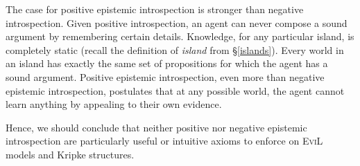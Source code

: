 The case for positive epistemic introspection is stronger than
negative introspection.  Given positive introspection, an agent can
never compose a sound argument by remembering certain details.
Knowledge, for any particular island, is completely static
(recall the definition of \emph{island} from \S\ref{islands}). Every
world in an island has exactly the same set of propositions for 
which the agent has a sound argument.  Positive epistemic
introspection, even more than negative epistemic introspection,
postulates that at any possible world, the agent cannot learn anything
by appealing to their own evidence. 

Hence, we should conclude that neither positive nor negative
epistemic introspection are particularly useful or intuitive axioms to
enforce on \textsc{EviL} models and Kripke structures.

